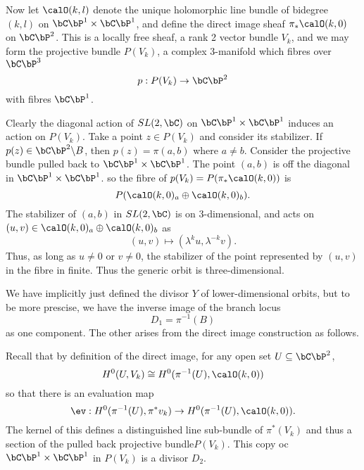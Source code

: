 Now let $\calO(k, l)$ denote the unique holomorphic line bundle of bidegree $(k,l)$ on $\bC\bP^{1}\times \bC\bP^{1}$, and define the direct image sheaf $\pi_{*}\calO(k, 0)$ on $\bC\bP^{2}$. This is a locally free sheaf, a rank 2 vector bundle $V_{k}$, and we may form the  projective bundle $P(V_{k})$, a complex 3-manifold which fibres over $\bC\bP^{3}$
$$
p : P(V_{k})\rightarrow \bC\bP^{2}
$$
with fibres $\bC\bP^{1}$.

Clearly the diagonal action of $SL(2,\bC)$ on $\bC\bP^{1} \times \bC\bP^{1}$ induces an action on $P(V_{k})$. Take a point $z \in P(V_{k})$ and consider its stabilizer. If $p(z) \in \bC\bP^{2}\backslash B$, then $p(z) = \pi(a, b)$ where $a\neq b$. Consider the projective bundle pulled back to $\bC\bP^{1} \times \bC\bP^{1}$. The point $(a, b)$ is off the diagonal in $\bC\bP^{1}\times \bC\bP^{1}$. so the fibre of $p(V_{k}) = P(\pi_{*}\calO(k, 0))$ is
\begin{equation}\label{art7-eq-7}
P(\calO(k,0)_{a}\oplus \calO(k,0)_{b}).
\end{equation}
The stabilizer of $(a, b)$ in $SL(2, \bC)$ is on 3-dimensional, and acts on\break $(u, v) \in \calO (k, 0)_{a}\oplus \calO(k,0)_{b}$ as
$$
(u, v)\mapsto(\lambda^{k}u, \lambda^{-k}v).
$$
Thus, as long as $u \neq 0$ or $v\neq 0$, the stabilizer of the point represented by $(u, v)$ in the fibre in finite. Thus the generic orbit is three-dimensional.

We have implicitly just defined the divisor $Y$ of lower-dimensional orbits, but to be more prescise, we have the inverse image of the branch locus
$$
D_{1}= \pi^{-1}(B)
$$
as one component. The other arises from the direct image construction as follows.

Recall that by definition of the direct image, for any open set $U\subseteq \bC\bP^{2}$,
$$
H^{0}(U, V_{k}) \cong H^{0}(\pi^{-1}(U), \calO(k, 0))
$$
so that there is an evaluation map
$$
\ev: H^{0}(\pi^{-1}(U), \pi^{*}v_{k})\rightarrow H^{0}(\pi^{-1}(U), \calO(k,0)).
$$
The kernel of this defines a distinguished line sub-bundle of $\pi^{*}(V_{k})$ and thus a section of the pulled back projective bundle$P(V_{k})$. This copy oc $\bC\bP^{1} \times \bC\bP^{1}$ in $P(V_{k})$ is a divisor $D_{2}$.

